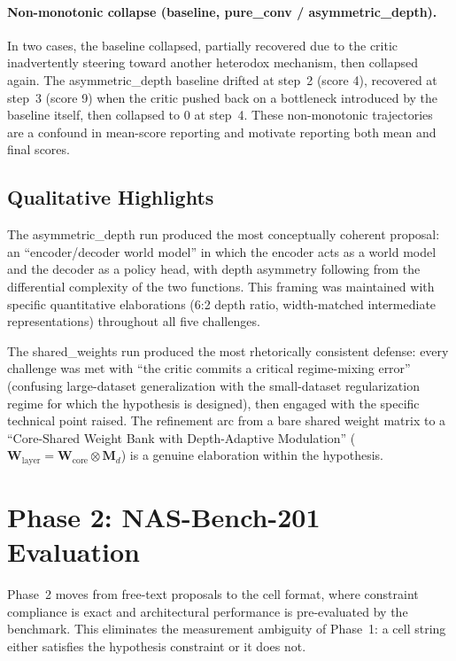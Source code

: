 \paragraph{Non-monotonic collapse (baseline, pure\_conv / asymmetric\_depth).}
In two cases, the baseline collapsed, partially recovered due to the critic
inadvertently steering toward another heterodox mechanism, then collapsed again.
The asymmetric\_depth baseline drifted at step~2 (score 4), recovered at step~3
(score 9) when the critic pushed back on a bottleneck introduced by the baseline
itself, then collapsed to 0 at step~4. These non-monotonic trajectories are a
confound in mean-score reporting and motivate reporting both mean and final scores.

\subsection{Qualitative Highlights}
\label{sec:phase1-qualitative}

The asymmetric\_depth \haas{} run produced the most conceptually coherent
proposal: an ``encoder/decoder world model'' in which the encoder acts as a world
model and the decoder as a policy head, with depth asymmetry following from the
differential complexity of the two functions. This framing was maintained with
specific quantitative elaborations (6:2 depth ratio, width-matched intermediate
representations) throughout all five challenges.

The shared\_weights \haas{} run produced the most rhetorically consistent
defense: every challenge was met with ``the critic commits a critical
regime-mixing error'' (confusing large-dataset generalization with the
small-dataset regularization regime for which the hypothesis is designed), then
engaged with the specific technical point raised. The refinement arc from a
bare shared weight matrix to a ``Core-Shared Weight Bank with Depth-Adaptive
Modulation'' ($\mathbf{W}_\text{layer} = \mathbf{W}_\text{core} \otimes
\mathbf{M}_d$) is a genuine elaboration within the hypothesis.

\section{Phase 2: NAS-Bench-201 Evaluation}
\label{sec:phase2}

Phase~2 moves from free-text proposals to the \nasbench{} cell format, where
constraint compliance is exact and architectural performance is pre-evaluated by
the benchmark. This eliminates the measurement ambiguity of Phase~1: a cell
string either satisfies the hypothesis constraint or it does not.

